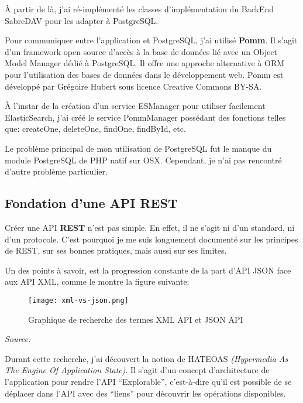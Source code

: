 À partir de là, j'ai ré-implémenté les classes d'implémentation du BackEnd SabreDAV pour les adapter à PostgreSQL.

Pour communiquer entre l'application et PostgreSQL, j'ai utilisé \textbf{Pomm}. Il s'agit d'un framework open source d'accès à la base de données lié avec un Object Model Manager dédié à PostgreSQL. Il offre une approche alternative à ORM pour l'utilisation des bases de données dans le développement web. Pomm est développé par Grégoire Hubert sous licence Creative Commons BY-SA.

À l'instar de la création d'un service ESManager pour utiliser facilement ElasticSearch, j'ai créé le service PommManager possédant des fonctions telles que: createOne, deleteOne, findOne, findById, etc.

Le problème principal de mon utilisation de PostgreSQL fut le manque du module PostgreSQL de PHP natif sur OSX. Cependant, je n'ai pas rencontré d'autre problème particulier.

\subsection{Fondation d'une API REST}

Créer une API \textbf{REST} n'est pas simple. En effet, il ne s'agit ni d'un standard, ni d'un protocole. C'est pourquoi je me suis longuement documenté sur les principes de REST, sur ses bonnes pratiques, mais aussi sur ses limites. 

Un des points à savoir, est la progression constante de la part d'API JSON face aux API XML, comme le montre la figure suivante:

\begin{figure}[H]
\begin{center}
\texttt{[image: xml-vs-json.png]}
\end{center}
\caption{Graphique de recherche des termes XML API et JSON API}
\end{figure}

\textit{Source: }

Durant cette recherche, j'ai découvert la notion de HATEOAS \textit{(Hypermedia As The Engine Of Application State)}. Il s'agit d'un concept d'architecture de l'application pour rendre l'API ``Explorable'', c'est-à-dire qu'il est possible de se déplacer dans l'API avec des ``liens'' pour découvrir les opérations disponibles.

